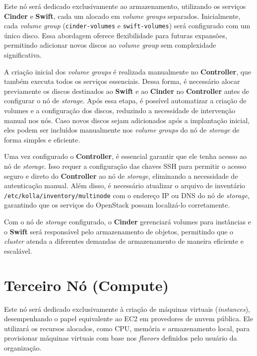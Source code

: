 Este nó será dedicado exclusivamente ao armazenamento, utilizando os serviços \textbf{Cinder} e \textbf{Swift}, cada um alocado em \textit{volume groups} separados. Inicialmente, cada \textit{volume group} (\texttt{cinder-volumes} e \texttt{swift-volumes}) será configurado com um único disco. Essa abordagem oferece flexibilidade para futuras expansões, permitindo adicionar novos discos ao \textit{volume group} sem complexidade significativa.

A criação inicial dos \textit{volume groups} é realizada manualmente no \textbf{Controller}, que também executa todos os serviços essenciais. Dessa forma, é necessário alocar previamente os discos destinados ao \textbf{Swift} e ao \textbf{Cinder} no \textbf{Controller} antes de configurar o nó de \textit{storage}. Após essa etapa, é possível automatizar a criação de volumes e a configuração dos discos, reduzindo a necessidade de intervenção manual nos nós. Caso novos discos sejam adicionados após a implantação inicial, eles podem ser incluídos manualmente nos \textit{volume groups} do nó de \textit{storage} de forma simples e eficiente.

Uma vez configurado o \textbf{Controller}, é essencial garantir que ele tenha acesso ao nó de \textit{storage}. Isso requer a configuração das chaves SSH para permitir o acesso seguro e direto do \textbf{Controller} ao nó de \textit{storage}, eliminando a necessidade de autenticação manual. Além disso, é necessário atualizar o arquivo de inventário \texttt{/etc/kolla/inventory/multinode} com o endereço IP ou DNS do nó de \textit{storage}, garantindo que os serviços do OpenStack possam localizá-lo corretamente.

Com o nó de \textit{storage} configurado, o \textbf{Cinder} gerenciará volumes para instâncias e o \textbf{Swift} será responsável pelo armazenamento de objetos, permitindo que o \textit{cluster} atenda a diferentes demandas de armazenamento de maneira eficiente e escalável.


\section{Terceiro Nó (Compute)}

Este nó será dedicado exclusivamente à criação de máquinas virtuais (\textit{instances}), desempenhando o papel equivalente ao EC2 em provedores de nuvem pública. Ele utilizará os recursos alocados, como CPU, memória e armazenamento local, para provisionar máquinas virtuais com base nos \textit{flavors} definidos pelo usuário da organização.

